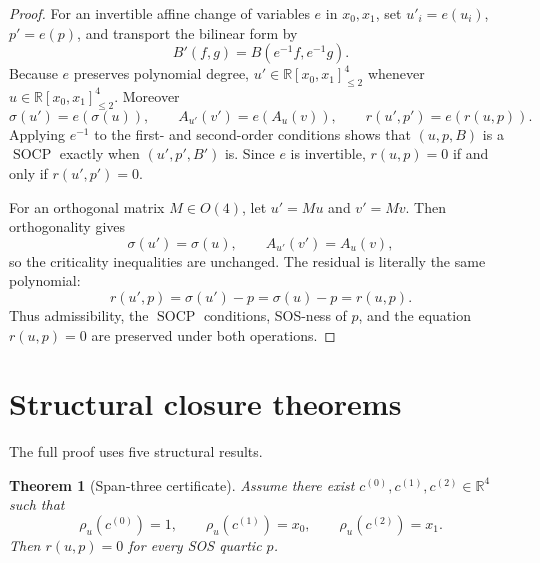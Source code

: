 \documentclass[10pt]{article}
\newtheorem{theorem}{Theorem}[section]
\theoremstyle{definition}
\newcommand{\R}{\mathbb{R}}
\newcommand{\Poly}{\R[x_0,x_1]}
\newcommand{\Quad}{\Poly_{\le 2}}
\newcommand{\SOCP}{\operatorname{SOCP}}
\newcommand{\sig}{\sigma}
\newcommand{\rel}{\rho}
\begin{document}
\begin{proof}
For an invertible affine change of variables \(e\) in \(x_0,x_1\), set
\(u'_i=e(u_i)\), \(p'=e(p)\), and transport the bilinear form by
\[
  B'(f,g)=B(e^{-1}f,e^{-1}g).
\]
Because \(e\) preserves polynomial degree, \(u'\in \Quad^4\) whenever
\(u\in \Quad^4\). Moreover
\[
  \sig(u')=e(\sig(u)),\qquad
  A_{u'}(v')=e(A_u(v)),\qquad
  r(u',p')=e(r(u,p)).
\]
Applying \(e^{-1}\) to the first- and second-order conditions shows that
\((u,p,B)\) is a \(\SOCP\) exactly when \((u',p',B')\) is. Since \(e\) is
invertible, \(r(u,p)=0\) if and only if \(r(u',p')=0\).

For an orthogonal matrix \(M\in O(4)\), let \(u'=Mu\) and \(v'=Mv\). Then
orthogonality gives
\[
  \sig(u')=\sig(u),\qquad A_{u'}(v')=A_u(v),
\]
so the criticality inequalities are unchanged. The residual is literally the
same polynomial:
\[
  r(u',p)=\sig(u')-p=\sig(u)-p=r(u,p).
\]
Thus admissibility, the \(\SOCP\) conditions, SOS-ness of \(p\), and the
equation \(r(u,p)=0\) are preserved under both operations.
\end{proof}

\section{Structural closure theorems}\label{sec:global-closures}
The full proof uses five structural results.

\begin{theorem}[Span-three certificate]
\label{thm:contains-aff1}
Assume there exist \(c^{(0)},c^{(1)},c^{(2)}\in \R^4\) such that
\[
  \rel_u(c^{(0)})=1,\qquad
  \rel_u(c^{(1)})=x_0,\qquad
  \rel_u(c^{(2)})=x_1.
\]
Then \(r(u,p)=0\) for every SOS quartic \(p\).
\end{theorem}
\end{document}
